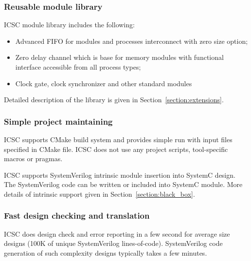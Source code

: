 \subsubsection{Reusable module library}

ICSC module library includes the following:
\begin{itemize}
\item Advanced FIFO for modules and processes interconnect with zero size option;  
\item Zero delay channel which is base for memory modules with functional interface accessible from all process types;
\item Clock gate, clock synchronizer and other standard modules
\end{itemize} 
%
Detailed description of the library is given in Section~\ref{section:extensions}.

\subsubsection{Simple project maintaining}

ICSC supports CMake build system and provides simple run with input files specified in CMake file. ICSC does not use any project scripts, tool-specific macros or pragmas. 

ICSC supports SystemVerilog intrinsic module insertion into SystemC design. The SystemVerilog code can be written or included into SystemC module. More details of intrinsic support given in Section~\ref{section:black_box}.

\subsubsection{Fast design checking and translation}

ICSC does design check and error reporting in a few second for average size designs (100K of unique SystemVerilog lines-of-code). SystemVerilog code generation of such complexity designs typically takes a few minutes.
